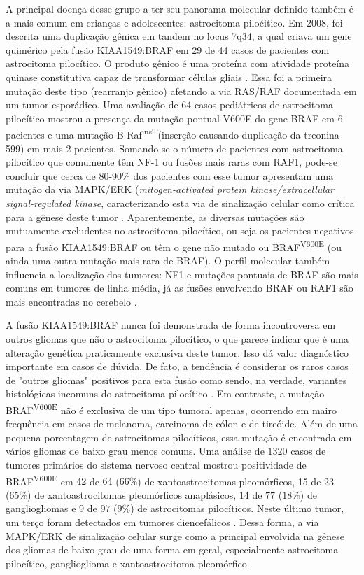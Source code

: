 \documentclass[11pt,a4paper,oldfontcommands]{memoir}
\begin{document}
A principal doença desse grupo a ter seu panorama molecular definido também é a mais comum em crianças e adolescentes: astrocitoma piloćitico. Em 2008, foi descrita uma duplicação gênica em tandem no locus 7q34, a qual criava um gene quimérico pela fusão KIAA1549:BRAF em 29 de 44 casos de pacientes com astrocitoma pilocítico. O produto gênico é uma proteína com atividade proteína quinase constitutiva capaz de transformar células gliais \cite{Jones8673}. Essa foi a primeira mutação deste tipo (rearranjo gênico) afetando a via RAS/RAF documentada em um tumor esporádico. Uma avaliação de 64 casos pediátricos de astrocitoma pilocítico mostrou a presença da mutação pontual V600E do gene BRAF em 6 pacientes e uma mutação B-Raf\textsuperscript{insT}(inserção causando duplicação da treonina 599) em mais 2 pacientes\cite{IJC25893}. Somando-se o número de pacientes com astrocitoma pilocítico que comumente têm NF-1 ou fusões mais raras com RAF1, pode-se concluir que cerca de 80-90\% dos pacientes com esse tumor apresentam uma mutação da via MAPK/ERK (\textit{mitogen-activated protein kinase/extracellular signal-regulated kinase}, caracterizando esta via de sinalização celular como crítica para a gênese deste tumor \cite{Jones2012}. Aparentemente, as diversas mutações são mutuamente excludentes no astrocitoma pilocítico, ou seja os pacientes negativos para a fusão KIAA1549:BRAF ou têm o gene não mutado ou BRAF\textsuperscript{V600E} (ou ainda uma outra mutação mais rara de BRAF). O perfil molecular também influencia a localização dos tumores: NF1 e mutações pontuais de BRAF são mais comuns em tumores de linha média, já as fusões envolvendo BRAF ou RAF1 são mais encontradas no cerebelo \cite{Jones2012}. 

A fusão KIAA1549:BRAF nunca foi demonstrada de forma incontroversa em outros gliomas que não o astrocitoma pilocítico, o que parece indicar que é uma alteração genética praticamente exclusiva deste tumor. Isso dá valor diagnóstico importante em casos de dúvida. De fato, a tendência é considerar os raros casos de "outros gliomas" positivos para esta fusão como sendo, na verdade, variantes histológicas incomuns do astrocitoma pilocítico \cite{Jones2012}. Em contraste, a mutação BRAF\textsuperscript{V600E} não é exclusiva de um tipo tumoral apenas, ocorrendo em mairo frequência em casos de melanoma, carcinoma de cólon e de tireóide. Além de uma pequena porcentagem de astrocitomas pilocíticos, essa mutação é encontrada em vários gliomas de baixo grau menos comuns. Uma análise de \(1320\) casos de tumores primários do sistema nervoso central mostrou positividade de BRAF\textsuperscript{V600E} em \(42\) de \(64\) (\(66\%\)) de xantoastrocitomas pleomórficos, 15 de 23 (65\%) de xantoastrocitomas pleomórficos anaplásicos, \(14\) de \(77\) (\(18\%\)) de gangliogliomas e \(9\) de \(97\) (\(9\%\)) de astrocitomas pilocíticos. Neste último tumor, um terço foram detectados em tumores diencefálicos \cite{Schindler2011}. Dessa forma, a via MAPK/ERK de sinalização celular surge como a principal envolvida na gênese dos gliomas de baixo grau de uma forma em geral, especialmente astrocitoma pilocítico, ganglioglioma e xantoastrocitoma pleomórfico.
\end{document}
